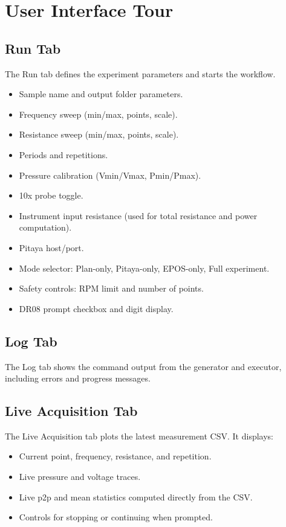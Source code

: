 \documentclass[11pt,a4paper]{article}
\begin{document}
\section{User Interface Tour}
\subsection{Run Tab}
The Run tab defines the experiment parameters and starts the workflow.
\begin{itemize}[leftmargin=*]
\item Sample name and output folder parameters.
\item Frequency sweep (min/max, points, scale).
\item Resistance sweep (min/max, points, scale).
\item Periods and repetitions.
\item Pressure calibration (Vmin/Vmax, Pmin/Pmax).
\item 10x probe toggle.
\item Instrument input resistance (used for total resistance and power computation).
\item Pitaya host/port.
\item Mode selector: Plan-only, Pitaya-only, EPOS-only, Full experiment.
\item Safety controls: RPM limit and number of points.
\item DR08 prompt checkbox and digit display.
\end{itemize}

\subsection{Log Tab}
The Log tab shows the command output from the generator and executor, including errors and progress messages.

\subsection{Live Acquisition Tab}
The Live Acquisition tab plots the latest measurement CSV. It displays:
\begin{itemize}[leftmargin=*]
\item Current point, frequency, resistance, and repetition.
\item Live pressure and voltage traces.
\item Live p2p and mean statistics computed directly from the CSV.
\item Controls for stopping or continuing when prompted.
\end{itemize}
\end{document}
